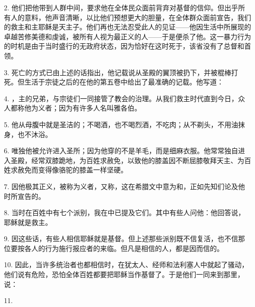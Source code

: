 2. 他们把他带到人群中间，要求他在全体民众面前背弃对基督的信仰。但出乎所有人的意料，他声音清晰，以比他们预想更大的胆量，在全体群众面前宣告，我们的救主和主耶稣是天主子。他们再也无法忍受此人的见证——他因生活中所展现的卓越苦修美德和虔诚，被所有人视为最正义的人——于是便杀了他。这一暴力行为的时机是由于当时盛行的无政府状态，因为恰好在这时死于，该省没有了总督和首领。\par

3. 死亡的方式已由上述的话指出，他记载说从圣殿的翼顶被扔下，并被棍棒打死。但生活于宗徒之后的在他的第五卷中给出了最准确的记载。他写道：\par

4. ，主的兄弟，与宗徒们一同接管了教会的治理。从我们救主时代直到今日，众人都称他为义者；因为有许多人名叫雅各伯。\par

5. 他从母腹中就是圣洁的；不喝酒，也不喝烈酒，不吃肉；从不剃头，不用油抹身，也不沐浴。\par

6. 唯独他被允许进入圣所；因为他穿的不是羊毛，而是细麻衣服。他常常独自进入圣殿，经常双膝跪地，为百姓求赦免，以致他的膝盖因不断屈膝敬拜天主、为百姓求赦免而变得像骆驼的膝盖一样坚硬。\par

7. 因他极其正义，被称为义者，又称，这在希腊文中意为和，正如先知们论及他时所宣告的。\par

8. 当时在百姓中有七个派别，我在中已提及它们。其中有些人问他：他回答说，耶稣就是救主。\par

9. 因这些话，有些人相信耶稣就是基督。但上述那些派别既不信复活，也不信那位要按各人的行为施行报应者的来临。但凡是相信的人，都是因而信的。\par

10. 因此，当许多统治者也都相信时，在犹太人、经师和法利塞人中就起了骚动，他们说有危险，恐怕全体百姓都要把耶稣当作基督了。于是他们一同来到那里，说：\par

11. \par

